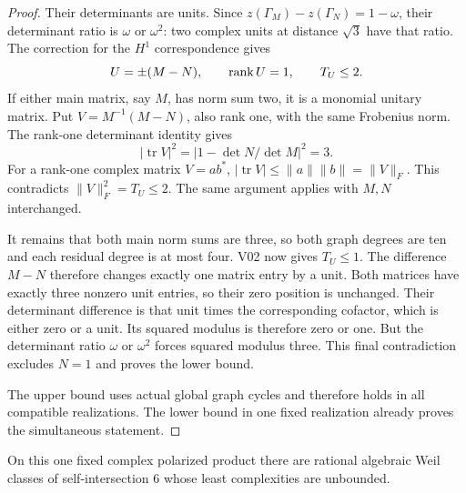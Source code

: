 \begin{proof}
Their determinants are units. Since
$z(\Gamma_M)-z(\Gamma_N)=1-\omega$, their determinant ratio is
$\omega$ or $\omega^2$: two complex units at distance $\sqrt3$ have
that ratio. The correction for the $H^1$ correspondence gives
\[
 U=\pm(M-N),\qquad \operatorname{rank} U=1,\qquad T_U\leq2.
\]
If either main matrix, say $M$, has norm sum two, it is a monomial
unitary matrix. Put $V=M^{-1}(M-N)$, also rank one, with the same
Frobenius norm. The rank-one determinant identity gives
\[
 |\operatorname{tr}V|^2
  =|1-\det N/\det M|^2=3.
\]
For a rank-one complex matrix $V=ab^*$,
$|\operatorname{tr}V|\leq\|a\|\|b\|=\|V\|_F$.
This contradicts $\|V\|_F^2=T_U\leq2$. The same argument applies
with $M,N$ interchanged.

It remains that both main norm sums are three, so both graph degrees
are ten and each residual degree is at most four. V02 now gives
$T_U\leq1$. The difference $M-N$ therefore changes exactly one matrix
entry by a unit. Both matrices have exactly three nonzero unit entries,
so their zero position is unchanged. Their determinant difference is
that unit times the corresponding cofactor, which is either zero or
a unit. Its squared modulus is therefore zero or one. But the
determinant ratio $\omega$ or $\omega^2$ forces squared modulus three.
This final contradiction excludes $N=1$ and proves the lower bound.

The upper bound uses actual global graph cycles and therefore holds in
all compatible realizations. The lower bound in one fixed realization
already proves the simultaneous statement.
\end{proof}

\begin{proposition}
On this one fixed complex polarized product there are rational algebraic
Weil classes of self-intersection $6$ whose least complexities are
unbounded.
\end{proposition}

